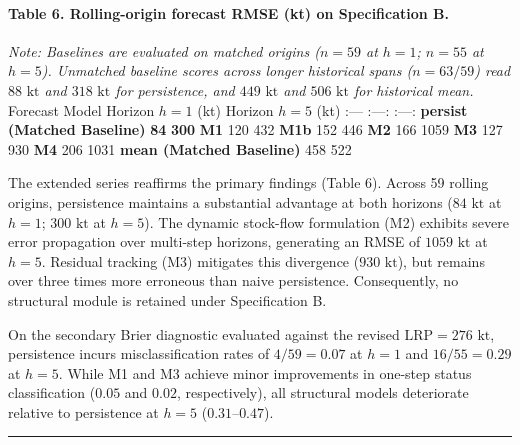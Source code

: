 \documentclass[11pt]{article}
\begin{document}
\paragraph{Table 6. Rolling-origin forecast RMSE (kt) on Specification
B.}\label{table-6.-rolling-origin-forecast-rmse-kt-on-specification-b.}

\emph{Note: Baselines are evaluated on matched origins (\(n=59\) at
\(h=1\); \(n=55\) at \(h=5\)). Unmatched baseline scores across longer
historical spans (\(n=63/59\)) read \(88\text{ kt}\) and
\(318\text{ kt}\) for persistence, and \(449\text{ kt}\) and
\(506\text{ kt}\) for historical mean.} \textbar{} Forecast Model
\textbar{} Horizon \(h=1\) (kt) \textbar{} Horizon \(h=5\) (kt)
\textbar{} \textbar{} :--- \textbar{} :---: \textbar{} :---: \textbar{}
\textbar{} \textbf{persist (Matched Baseline)} \textbar{} \textbf{84}
\textbar{} \textbf{300} \textbar{} \textbar{} \textbf{M1} \textbar{} 120
\textbar{} 432 \textbar{} \textbar{} \textbf{M1b} \textbar{} 152
\textbar{} 446 \textbar{} \textbar{} \textbf{M2} \textbar{} 166
\textbar{} 1059 \textbar{} \textbar{} \textbf{M3} \textbar{} 127
\textbar{} 930 \textbar{} \textbar{} \textbf{M4} \textbar{} 206
\textbar{} 1031 \textbar{} \textbar{} \textbf{mean (Matched Baseline)}
\textbar{} 458 \textbar{} 522 \textbar{}

The extended series reaffirms the primary findings (Table 6). Across 59
rolling origins, persistence maintains a substantial advantage at both
horizons (\(84\text{ kt}\) at \(h=1\); \(300\text{ kt}\) at \(h=5\)).
The dynamic stock-flow formulation (M2) exhibits severe error
propagation over multi-step horizons, generating an RMSE of
\(1059\text{ kt}\) at \(h=5\). Residual tracking (M3) mitigates this
divergence (\(930\text{ kt}\)), but remains over three times more
erroneous than naive persistence. Consequently, no structural module is
retained under Specification B.

On the secondary Brier diagnostic evaluated against the revised
\(\mathrm{LRP} = 276\text{ kt}\), persistence incurs misclassification
rates of \(4/59 = 0.07\) at \(h=1\) and \(16/55 = 0.29\) at \(h=5\).
While M1 and M3 achieve minor improvements in one-step status
classification (\(0.05\) and \(0.02\), respectively), all structural
models deteriorate relative to persistence at \(h=5\)
(\(0.31\text{--}0.47\)).

\begin{center}\rule{0.5\linewidth}{0.5pt}\end{center}
\end{document}

